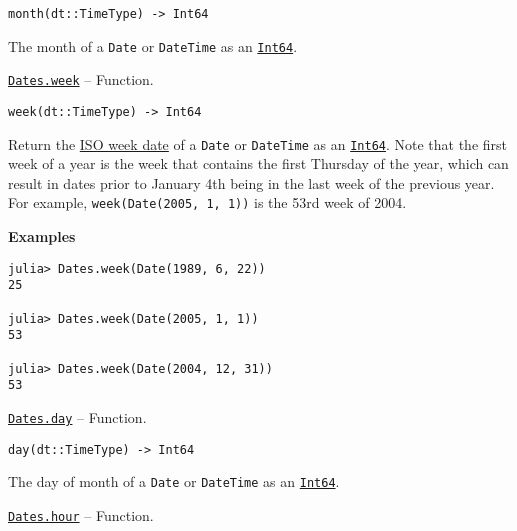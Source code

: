 \begin{adjustwidth}{2em}{0pt}


\begin{verbatim}
month(dt::TimeType) -> Int64
\end{verbatim}

The month of a \texttt{Date} or \texttt{DateTime} as an \hyperlink{7720564657383125058}{\texttt{Int64}}.



\end{adjustwidth}
\hypertarget{15002548627104558576}{} 
\hyperlink{15002548627104558576}{\texttt{Dates.week}}  -- {Function.}

\begin{adjustwidth}{2em}{0pt}


\begin{verbatim}
week(dt::TimeType) -> Int64
\end{verbatim}

Return the \href{https://en.wikipedia.org/wiki/ISO\_week\_date}{ISO week date} of a \texttt{Date} or \texttt{DateTime} as an \hyperlink{7720564657383125058}{\texttt{Int64}}. Note that the first week of a year is the week that contains the first Thursday of the year, which can result in dates prior to January 4th being in the last week of the previous year. For example, \texttt{week(Date(2005, 1, 1))} is the 53rd week of 2004.

\textbf{Examples}


\begin{verbatim}
julia> Dates.week(Date(1989, 6, 22))
25

julia> Dates.week(Date(2005, 1, 1))
53

julia> Dates.week(Date(2004, 12, 31))
53
\end{verbatim}



\end{adjustwidth}
\hypertarget{15216601024330128019}{} 
\hyperlink{15216601024330128019}{\texttt{Dates.day}}  -- {Function.}

\begin{adjustwidth}{2em}{0pt}


\begin{verbatim}
day(dt::TimeType) -> Int64
\end{verbatim}

The day of month of a \texttt{Date} or \texttt{DateTime} as an \hyperlink{7720564657383125058}{\texttt{Int64}}.



\end{adjustwidth}
\hypertarget{14478105094783051644}{} 
\hyperlink{14478105094783051644}{\texttt{Dates.hour}}  -- {Function.}

